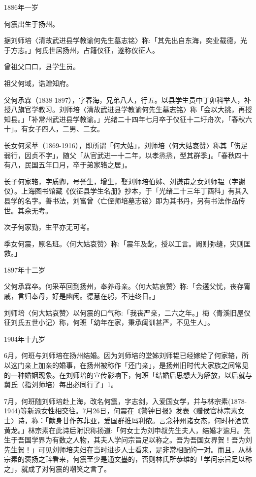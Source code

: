 \noindent 1886年一岁

何震出生于扬州。

据刘师培〈清故武进县学教谕何先生墓志铭〉称:「其先出自东海，奕业载德，光于方志。」何氏世居扬州，占籍仪征，遂称仪征人。

曾祖父口口，县学生员。

祖父何域，诰赠知府。

父何承霖（1838-1897），字春海，兄弟八人，行五。以县学生员中丁卯科举人，补授八旗官学教习。刘师培〈清故武进县学教谕何先生墓志铭〉称「会以大挑，再授知县。」「补常州武进县学教谕。」光绪二十四年七月卒于仪征十二圩舟次，「春秋六十」。有女子四人，二男、二女。

长女何采苹（1869-1916），即所谓「何大姑」，刘师培〈何大姑哀赞〉称其「伤足弱行，因贞不字」，随父「从官武进一十二年，以孝烝烝，型其群季」。「春秋四十有八，民国五年口月，卒于弟家辂之居」。

长子何家辂，字质卿，号誉生，增生，娶刘师培伯姊、刘谦甫之女刘师韫（字谢仪）。上海图书馆藏《仪征县学生名册》抄本，于「光绪二十三年丁酉科」有其入县学的名字。善书法，刘富曾〈亡侄师培墓志铭〉即为其书丹，另有书法作品传世。其余无考。

\vfill
\begin{BookNotes}
\end{BookNotes}

次子何家勤，生平亦无可考。

季女何震，原名班。〈何大姑哀赞〉称:「震年及龀，授以工言。阙则弥缝，灾则匡救。」

1897年十二岁

父何承霖卒。何采苹回到扬州，奉养母亲。〈何大姑哀赞〉称:「会遘父忧，丧存甯戚，言归奉母，好是幽闲。德慧在躬，不违终日。」

刘师培〈何大姑哀赞〉以何震的口气称:「我丧严亲，二六之年。」梅〈青溪旧屋仪征刘氏五世小记〉称，何班「幼年在家，秉承闺训甚严，不见生人」。

1904年十九岁

6月，何班与刘师培在扬州结婚。因为刘师培的堂姊刘师韫已经嫁给了何家辂，所以这门亲上加亲的婚事，在扬州被称作「还门亲」，是扬州旧时代大家族之间常见的一种婚姻现象。在刘师培的宣传影响下，何班「结婚后思想大为解放，以后就与舅氏（指刘师培）每出必同行了」1。

7月，何班随刘师培赴上海，改名何震，字志剑，入爱国女学，并与林宗素(1878-1944)等新派女性相交往。7月26日，何震在《警钟日报》发表〈赠侯官林宗素女士〉诗，称：「献身甘作苏菲亚，爱国群推玛利侬。言念神州诸女杰，何时杯酒饮黄龙。」林宗素在此诗后附识称扬道:「何女士为刘申叔先生夫人，结婚才逾月。先生于吾国学界为有数之人物，其夫人学问宗旨足以称之。吾为吾国女界贺！吾为刘先生贺！」可见刘师培夫妇在当时进步人士看来，是非常相配的一对。而且，从林宗素的褒扬之辞看来，何震至少是通文墨的，否则林氏所恭维的「学问宗旨足以称之」，就成了对何震的嘲笑之言了。

